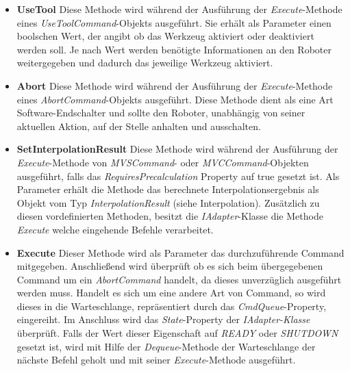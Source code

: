 \begin{itemize}
\item \textbf{UseTool}
\newline
Diese Methode wird während der Ausführung der \textit{Execute}-Methode eines \textit{UseToolCommand}-Objekts ausgeführt. Sie erhält als Parameter einen boolschen Wert, der angibt ob das Werkzeug aktiviert oder deaktiviert werden soll. Je nach Wert werden benötigte Informationen an den Roboter weitergegeben und dadurch das jeweilige Werkzeug aktiviert.
\item \textbf{Abort}
\newline
Diese Methode wird während der Ausführung der \textit{Execute}-Methode eines \textit{AbortCommand}-Objekts ausgeführt. Diese Methode dient als eine Art Software-Endschalter und sollte den Roboter, unabhängig von seiner aktuellen Aktion, auf der Stelle anhalten und ausschalten. 
\item \textbf{SetInterpolationResult}
\newline
Diese Methode wird während der Ausführung der \textit{Execute}-Methode von \textit{MVSCommand}- oder \textit{MVCCommand}-Objekten ausgeführt, falls das \textit{RequiresPrecalculation} Property auf true gesetzt ist. Als Parameter erhält die Methode das berechnete Interpolationsergebnis als Objekt vom Typ \textit{InterpolationResult} (siehe Interpolation).
Zusätzlich zu diesen vordefinierten Methoden, besitzt die \textit{IAdapter}-Klasse die Methode \textit{Execute} welche eingehende Befehle verarbeitet.
\item \textbf{Execute}
\newline
Dieser Methode wird als Parameter das durchzuführende Command mitgegeben. Anschließend wird überprüft ob es sich beim übergegebenen Command um ein \textit{AbortCommand} handelt, da dieses unverzüglich ausgeführt werden muss.
Handelt es sich um eine andere Art von Command, so wird dieses in die Warteschlange, repräsentiert durch das \textit{CmdQueue}-Property, eingereiht. Im Anschluss wird das \textit{State}-Property der \textit{IAdapter-Klasse} überprüft. Falls der Wert dieser Eigenschaft auf \textit{READY} oder \textit{SHUTDOWN} gesetzt ist, wird mit Hilfe der \textit{Dequeue}-Methode der Warteschlange der nächste Befehl geholt und mit seiner \textit{Execute}-Methode ausgeführt.
\end{itemize}

